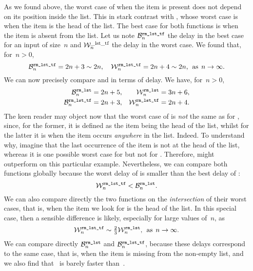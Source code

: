 As we found above, the worst case of  when the
item is present does not depend on its position inside the list. This
in stark contrast with , whose worst case is when
the item is the head of the list. The best case for both functions is
when the item is absent from the list. Let us note
\(\best{rm\_lst\_tf}{n}\) the delay in the best case for an input of
size~\(n\) and \(\worst{\rm\_lst\_tf}{n}\) the delay in the worst
case. We found that, for~\(n > 0\),
\begin{equation*}
  \best{rm\_lst\_tf}{n} = 2n + 3 \mathrel{\sim} 2n,
\quad
  \worst{rm\_lst\_tf}{n} = 2n + 4 \mathrel{\sim} 2n,\,\; \text{as}
  \,\; n \rightarrow \infty.
\end{equation*}
We can now precisely compare  and
 in terms of delay. We have, for~\(n > 0\),
\begin{align*}
\best{rm\_lst}{n}     &= 2n + 5, & \worst{rm\_lst}{n}     &= 3n + 6,\\
\best{rm\_lst\_tf}{n} &= 2n + 3, & \worst{rm\_lst\_tf}{n} &= 2n + 4.
\end{align*}
The keen reader may object now that the worst case
of  is \emph{not} the same as
for , since, for the former, it is defined as
the item being the head of the list, whilst for the latter it is when
the item occurs \emph{anywhere} in the list. Indeed. To understand
why, imagine that the last occurrence of the item is not at the head
of the list, whereas it is one possible worst case
for  but not for
. Therefore,  might outperform
 on this particular example. Nevertheless, we
can compare both functions globally because the worst delay
of  is smaller than the best delay
of :
\[
\worst{rm\_lst\_tf}{n} < \best{rm\_lst}{n}.
\]
We can also compare directly the two functions on the
\emph{intersection} of their worst cases, that is, when the item we
look for is the head of the list. In this special case, then a
sensible difference is likely, especially for large values of~\(n\),
as
\[
\worst{rm\_lst\_tf}{n} \mathrel{\sim}
\tfrac{2}{3}{\worst{rm\_lst}{n}},\,\; \text{as} \,\; n \rightarrow
\infty.
\]
We can compare directly \(\best{rm\_lst}{n}\) and
\(\best{rm\_lst\_tf}{n}\), because these delays correspond to the same
case, that is, when the item is missing from the non\hyp{}empty list,
and we also find that ~is barely faster
than~.


